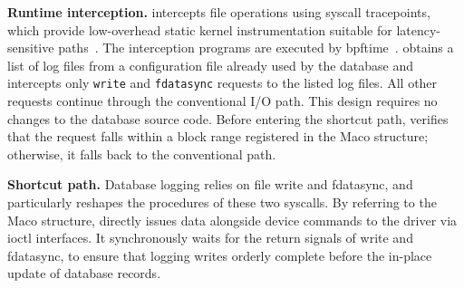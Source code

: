 
\textbf{Runtime interception.}
\odes intercepts file operations using syscall tracepoints, which provide
low-overhead static kernel instrumentation suitable for latency-sensitive
paths~\cite{TracingL22:online}. The interception programs are executed by
bpftime~\cite{bpftime}.
\odes obtains a list of log files from a configuration file already used by
the database and intercepts only \texttt{write} and \texttt{fdatasync} requests
to the listed log files. All other requests continue through the conventional
I/O path. This design requires no changes to the database source code. Before
entering the shortcut path, \odes verifies that the request falls within a
block range registered in the Maco structure; otherwise, it falls back to the
conventional path.


\textbf{Shortcut path.} Database logging relies on file write and fdatasync,  and 
\odes particularly reshapes the procedures of these two syscalls. 
By
referring to the Maco structure,
\odes directly issues data alongside device commands  to the driver via ioctl interfaces. 
It synchronously waits for the return signals of write and fdatasync, to ensure that
logging writes orderly complete before the in-place update of database records. 


